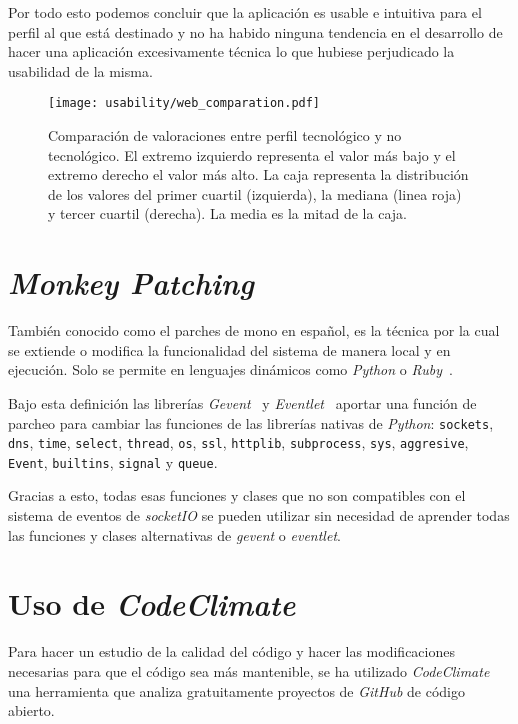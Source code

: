Por todo esto podemos concluir que la aplicación es usable e intuitiva para el perfil al que está destinado y no ha habido ninguna tendencia en el desarrollo de hacer una aplicación excesivamente técnica lo que hubiese perjudicado la usabilidad de la misma.

\begin{figure}[h]
	\centering
	\texttt{[image: usability/web\_comparation.pdf]}
	\caption[Comparación de valoraciones entre perfil tecnológico y no tecnológico.]{Comparación de valoraciones entre perfil tecnológico y no tecnológico. El extremo izquierdo representa el valor más bajo y el extremo derecho el valor más alto. La caja representa la distribución de los valores del primer cuartil (izquierda), la mediana (linea roja) y tercer cuartil (derecha). La media es la mitad de la caja.}
	\label{fig:usab_comp}
\end{figure}

\section{\textit{Monkey Patching}}\label{cap:mokey}

También conocido como el parches de mono en español, es la técnica por la cual se extiende o modifica la funcionalidad del sistema de manera local y en ejecución. Solo se permite en lenguajes dinámicos como \textit{Python} o \textit{Ruby}~\cite{wiki:monkey_patch}.

Bajo esta definición las librerías \textit{Gevent}~\cite{tool:gevent} y \textit{Eventlet}~\cite{tool:eventlet} aportar una función de parcheo para cambiar las funciones de las librerías nativas de \textit{Python}: \texttt{sockets}, \texttt{dns}, \texttt{time}, \texttt{select}, \texttt{thread}, \texttt{os}, \texttt{ssl}, \texttt{httplib}, \texttt{subprocess}, \texttt{sys}, \texttt{aggresive}, \texttt{Event}, \texttt{builtins}, \texttt{signal} y \texttt{queue}.

Gracias a esto, todas esas funciones y clases que no son compatibles con el sistema de eventos de \textit{socketIO} se pueden utilizar sin necesidad de aprender todas las funciones y clases alternativas de \textit{gevent} o \textit{eventlet}.

\section{Uso de \textit{CodeClimate}}
Para hacer un estudio de la calidad del código y hacer las modificaciones necesarias para que el código sea más mantenible, se ha utilizado \textit{CodeClimate} una herramienta que analiza gratuitamente proyectos de \textit{GitHub} de código abierto.

